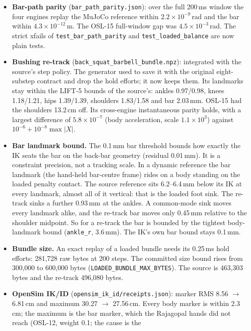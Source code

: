 \documentclass[11pt,a4paper]{article}
\begin{document}
\begin{itemize}[nosep]
\item \textbf{Bar-path parity} (\texttt{bar\_path\_parity.json}): over the
  full 200\,ms window the four engines replay the MuJoCo reference within
  $2.2\times10^{-9}$\,rad and the bar within $4.3\times10^{-12}$\,m. The
  OSL-15 full-window gap was $4.5\times10^{-3}$\,rad. The strict xfails of
  \texttt{test\_bar\_path\_parity} and \texttt{test\_loaded\_balance} are now
  plain tests.
\item \textbf{Bushing re-track} (\texttt{back\_squat\_barbell\_bundle.npz}):
  integrated with the source's step policy. The generator used to save it with
  the original eight-substep contract and drop the hold efforts; it now keeps
  them. Its landmarks stay within the LIFT-5 bounds of the source's: ankles
  0.97/0.98, knees 1.18/1.21, hips 1.39/1.39, shoulders 1.83/1.58 and bar
  2.03\,mm. OSL-15 had the shoulders 13.2\,cm off. Its cross-engine
  instantaneous parity holds, with a largest difference of
  $5.8\times10^{-7}$ (body acceleration, scale $1.1\times10^{3}$) against
  $10^{-6}+10^{-8}\max|X|$.
\item \textbf{Bar landmark bound.} The 0.1\,mm bar threshold bounds how
  exactly the IK seats the bar on the back-bar geometry (residual 0.01\,mm).
  It is a constraint precision, not a tracking scale. In a dynamic reference
  the bar landmark (the hand-held bar-centre frame) rides on a body standing
  on the loaded penalty contact. The source reference sits 6.2--6.4\,mm
  below its IK at every landmark, almost all of it vertical: that is the
  loaded foot sink. The re-track sinks a further 0.93\,mm at the ankles. A
  common-mode sink moves every landmark alike, and the re-track bar moves
  only 0.45\,mm relative to the shoulder midpoint. So for a re-track the bar
  is bounded by the tightest body-landmark bound (\texttt{ankle\_r},
  3.6\,mm). The IK's own bar bound stays 0.1\,mm.
\item \textbf{Bundle size.} An exact replay of a loaded bundle needs its
  0.25\,ms hold efforts: 281{,}728 raw bytes at 200 steps. The committed size
  bound rises from 300{,}000 to 600{,}000 bytes
  (\texttt{LOADED\_BUNDLE\_MAX\_BYTES}). The source is 463{,}303 bytes and the
  re-track 496{,}080 bytes.
\item \textbf{OpenSim IK/ID} (\texttt{opensim\_ik\_id/receipts.json}):
  marker RMS 8.56 $\to$ 6.81\,cm and maximum 30.27 $\to$ 27.56\,cm. Every
  body marker is within 2.3\,cm; the maximum is the bar marker, which the
  Rajagopal hands did not reach (OSL-12, weight 0.1; the cause is the

\end{itemize}
\end{document}
